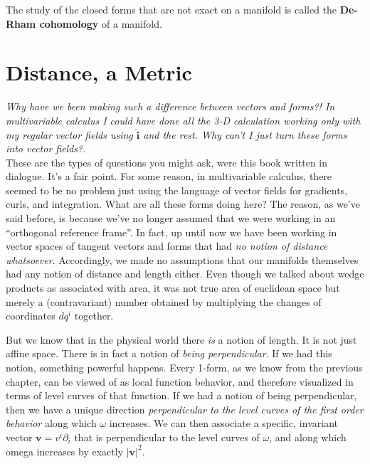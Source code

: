 	The study of the closed forms that are not exact on a manifold is called the \textbf{De-Rham cohomology} of a manifold. \\
	
	
	
	\section{Distance, a Metric}	
	
	
	\emph{Why have we been making such a difference between vectors and forms?! In multivariable calculus I could have done all the 3-D calculation working only with my regular vector fields using $\hat{\mathbf{i}}$ and the rest. Why can't I just turn these forms into vector fields?}.\\
	
	These are the types of questions you might ask, were this book written in dialogue. It's a fair point. For some reason, in multivariable calculus, there seemed to be no problem just using the language of vector fields for gradients, curls, and integration. What are all these forms doing here? The reason, as we've said before, is because we've no longer assumed that we were working in an ``orthogonal reference frame''. In fact, up until now we have been working in vector spaces of tangent vectors and forms that had \emph{no notion of distance whatsoever}. Accordingly, we made no assumptions that our manifolds themselves had any notion of distance and length either. Even though we talked about wedge products as associated with area, it was not true area of euclidean space but merely a (contravariant) number obtained by multiplying the changes of coordinates $dq^i$ together. 
	
	
	But we know that in the physical world there \emph{is} a notion of length. It is not just affine space. There is in fact a notion of \emph{being perpendicular}. If we had this notion, something powerful happens. Every 1-form, as we know from the previous chapter, can be viewed of as local function behavior, and therefore visualized in terms of level curves of that function. If we had a notion of being perpendicular, then we have a unique direction \emph{perpendicular to the level curves of the first order behavior} along which $\omega$ increases. We can then associate a specific, invariant vector $\mathbf v = v^i \partial_i$ that is perpendicular to the level curves of $\omega$, and along which omega increases by exactly $|\mathbf v|^2$. 
	
